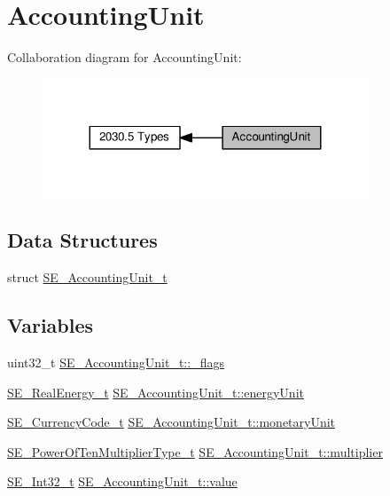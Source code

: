 \hypertarget{group__AccountingUnit}{}\section{Accounting\+Unit}
\label{group__AccountingUnit}
Collaboration diagram for Accounting\+Unit\+:\nopagebreak
\begin{figure}[H]
\begin{center}
\leavevmode
\includegraphics[width=275pt]{group__AccountingUnit}
\end{center}
\end{figure}
\subsection*{Data Structures}
\begin{DoxyCompactItemize}
\item 
struct \hyperlink{structSE__AccountingUnit__t}{S\+E\+\_\+\+Accounting\+Unit\+\_\+t}
\end{DoxyCompactItemize}
\subsection*{Variables}
\begin{DoxyCompactItemize}
\item 
uint32\+\_\+t \hyperlink{group__AccountingUnit_ga955b8d2446e61fde2b55b98207719d4e}{S\+E\+\_\+\+Accounting\+Unit\+\_\+t\+::\+\_\+flags}
\item 
\hyperlink{structSE__RealEnergy__t}{S\+E\+\_\+\+Real\+Energy\+\_\+t} \hyperlink{group__AccountingUnit_gaaa1abdf6bb3cb5cda82403e02c17136b}{S\+E\+\_\+\+Accounting\+Unit\+\_\+t\+::energy\+Unit}
\item 
\hyperlink{group__CurrencyCode_gadef02433fe757d7bd9fd0d9b59f690a0}{S\+E\+\_\+\+Currency\+Code\+\_\+t} \hyperlink{group__AccountingUnit_ga3dcc7761e45b6e3b62acb258997ba854}{S\+E\+\_\+\+Accounting\+Unit\+\_\+t\+::monetary\+Unit}
\item 
\hyperlink{group__PowerOfTenMultiplierType_gaf0317b781dc8dbb9cb6ac4e44a14fdef}{S\+E\+\_\+\+Power\+Of\+Ten\+Multiplier\+Type\+\_\+t} \hyperlink{group__AccountingUnit_ga56b43f2fc79c97ad77b7809ea172d72f}{S\+E\+\_\+\+Accounting\+Unit\+\_\+t\+::multiplier}
\item 
\hyperlink{group__Int32_gaa7afc819cfc8033c5fa408e34da8b71a}{S\+E\+\_\+\+Int32\+\_\+t} \hyperlink{group__AccountingUnit_ga3c90f530724e607bdb4b133c0fae9df4}{S\+E\+\_\+\+Accounting\+Unit\+\_\+t\+::value}
\end{DoxyCompactItemize}


